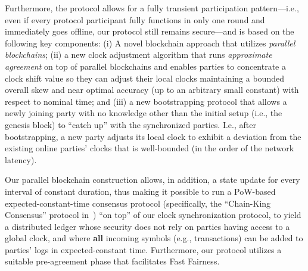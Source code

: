 Furthermore, the protocol allows for a fully transient participation pattern---i.e., even if every protocol participant fully functions in only one round and immediately goes offline, our protocol still remains secure---and is based on the following key components:
%
(i) A novel blockchain approach that utilizes \emph{parallel blockchains};
%
(ii) a new clock adjustment algorithm that runs \emph{approximate agreement} on top of parallel blockchains and enables parties to concentrate a clock shift value so they can adjust their local clocks maintaining a bounded overall skew and near optimal accuracy (up to an arbitrary small constant) with respect to nominal time;
%
and (iii) a new bootstrapping protocol that allows a newly joining party with no knowledge other than the initial setup (i.e., the genesis block) to ``catch up'' with the synchronized parties.
%
I.e., after bootstrapping, a new party adjusts its local clock to exhibit a  deviation from the existing online parties' clocks that is well-bounded (in the order of the network latency).

Our parallel blockchain construction allows, in addition, a state update for every interval of constant duration, thus making it possible to run a PoW-based expected-constant-time consensus protocol (specifically, the ``Chain-King Consensus'' protocol in~\cite{EC:GarKiaShe24}) ``on top'' of our clock synchronization protocol, to yield a distributed ledger whose security does not rely on parties having access to a global clock, and where \textbf{all} incoming symbols (e.g., transactions) can be added to parties' logs in expected-constant time.
%
Furthermore, our protocol utilizes a suitable pre-agreement phase that facilitates Fast Fairness.

